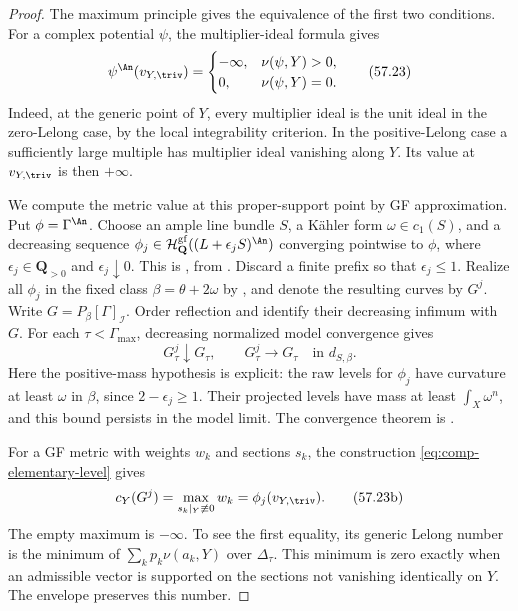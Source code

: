 \begin{proof}
The maximum principle \cite[Lemma~1.4(i)]{BJ22} gives the
equivalence of the first two conditions.
For a complex potential $\psi$, the multiplier-ideal formula gives
\[
 \psi^{\An}(v_{Y,\triv})=
 \begin{cases}
 -\infty,&\nu(\psi,Y)>0,\\
 0,&\nu(\psi,Y)=0.
 \end{cases}
\tag{57.23}\label{eq:comp-generic-trivial-value}
\]
Indeed, at the generic point of $Y$, every multiplier ideal is the
unit ideal in the zero-Lelong case, by the local integrability
criterion. In the positive-Lelong case a sufficiently large
multiple has multiplier ideal vanishing along $Y$.
Its value at $v_{Y,\triv}$ is then $+\infty$.

We compute the metric value at this proper-support point by
GF approximation. Put $\phi=\Gamma^{\An}$.
Choose an ample line bundle $S$, a K\"ahler form $\omega\in c_1(S)$,
and a decreasing sequence
$\phi_j\in\mathcal H^{\mathrm{gf}}_{\mathbf Q}((L+\epsilon_jS)^{\An})$
converging pointwise to $\phi$, where
$\epsilon_j\in\mathbf Q_{>0}$ and $\epsilon_j\downarrow0$.
This is \cite[Theorem~2.12]{DXZ23}, from
\cite[Corollary~12.18]{BJ22}.
Discard a finite prefix so that $\epsilon_j\leq1$.
Realize all $\phi_j$ in the fixed class
$\beta=\theta+2\omega$ by , and
denote the resulting curves by $G^j$.
Write $G=P_\beta[\Gamma]_{\mathcal I}$.
Order reflection and  identify
their decreasing infimum with $G$.
For each $\tau<\Gamma_{\max}$, decreasing normalized model
convergence gives
\[
 G^j_\tau\downarrow G_\tau,
 \qquad G^j_\tau\longrightarrow G_\tau\quad\text{in }d_{S,\beta}.
\tag{57.23a}\label{eq:comp-gf-level-convergence}
\]
Here the positive-mass hypothesis is explicit: the raw levels for
$\phi_j$ have curvature at least $\omega$ in $\beta$, since
$2-\epsilon_j\geq1$. Their projected levels have mass at least
$\int_X\omega^n$, and this bound persists in the model limit.
The convergence theorem is
\cite[Proposition~3.1.12, Corollary~6.2.7]{XiaBook}.

For a GF metric with weights $w_k$ and sections $s_k$, the
construction \eqref{eq:comp-elementary-level} gives
\[
 c_Y(G^j)=\max_{s_k|_Y\not\equiv0}w_k
         =\phi_j(v_{Y,\triv}).
\tag{57.23b}\label{eq:comp-gf-restriction-cutoff}
\]
The empty maximum is $-\infty$.
To see the first equality, its generic Lelong number is the minimum
of $\sum_kp_k\nu(a_k,Y)$ over $\Delta_\tau$.
This minimum is zero exactly when an admissible vector is supported
on the sections not vanishing identically on $Y$.
The envelope preserves this number.


\end{proof}
